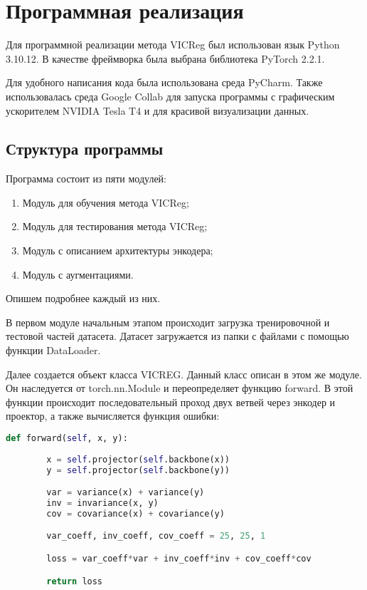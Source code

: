 \section{Программная реализация}
\label{sec:Chapter5} 

Для программной реализации метода VICReg был использован язык Python 3.10.12. В качестве фреймворка была выбрана библиотека PyTorch 2.2.1. 

Для удобного написания кода была использована среда PyCharm. Также использовалась среда Google Collab для запуска программы с графическим ускорителем NVIDIA Tesla T4 и для красивой визуализации данных. 

\subsection{Структура программы}

Программа состоит из пяти модулей:
\begin{enumerate}
    \item Модуль для обучения метода VICReg;
    \item Модуль для тестирования метода VICReg;
    \item Модуль с описанием архитектуры энкодера;
    \item Модуль с аугментациями.
\end{enumerate}

Опишем подробнее каждый из них. 

В первом модуле начальным этапом происходит загрузка тренировочной и тестовой частей датасета. Датасет загружается из папки с файлами с помощью функции DataLoader. 

Далее создается объект класса VICREG. Данный класс описан в этом же модуле. Он наследуется от torch.nn.Module и переопределяет функцию forward. В этой функции происходит последовательный проход двух ветвей через энкодер и проектор, а также вычисляется функция ошибки:

\begin{lstlisting}[language=python, caption=Функция forward класса VICREG]
    def forward(self, x, y):
        
        x = self.projector(self.backbone(x))
        y = self.projector(self.backbone(y))

        var = variance(x) + variance(y)
        inv = invariance(x, y)
        cov = covariance(x) + covariance(y)

        var_coeff, inv_coeff, cov_coeff = 25, 25, 1

        loss = var_coeff*var + inv_coeff*inv + cov_coeff*cov

        return loss
\end{lstlisting}

